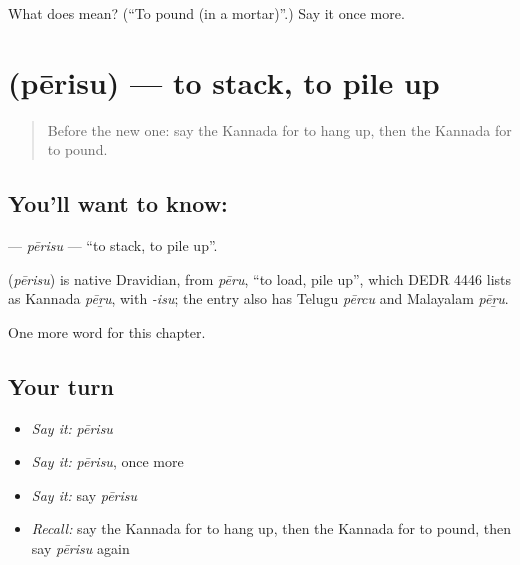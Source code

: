 \begin{tcolorbox}[breakable,colback=teal!4,colframe=teal!35!black,title={Before you move on}]
What does  mean? (\textquotedblleft{}To pound (in a mortar)\textquotedblright{}.) Say it once more.
\end{tcolorbox}
\section[\texorpdfstring{\kn{ಪೇರಿಸು} (pērisu)}{ಪೇರಿಸು (pērisu)}]{ (pērisu) — to stack, to pile up}

\label{lesson:KA-C207-perisu}



\begin{quote}
Before the new one: say the Kannada for to hang up, then the Kannada for to pound.
\end{quote}

\subsection*{You'll want to know: }
\textbf{} — \emph{pērisu} — \textquotedblleft{}to stack, to pile up\textquotedblright{}.

\begin{cousinweb}
\textbf{} (\emph{pērisu}) is native Dravidian, from \emph{pēru}, \textquotedblleft{}to load, pile up\textquotedblright{}, which DEDR 4446 lists as Kannada \emph{pēṟu}, with \emph{-isu}; the entry also has Telugu \emph{pērcu} and Malayalam \emph{pēṟu}.
\end{cousinweb}

\begin{grammarlens}[title={What you've built}]
One more word for this chapter.
\end{grammarlens}

\subsection*{Your turn}
\begin{itemize}
\raggedright
  \item \emph{Say it:} \emph{pērisu}
  \item \emph{Say it:} \emph{pērisu}, once more
  \item \emph{Say it:} say \emph{pērisu}
  \item \emph{Recall:} say the Kannada for to hang up, then the Kannada for to pound, then say \emph{pērisu} again
\end{itemize}

